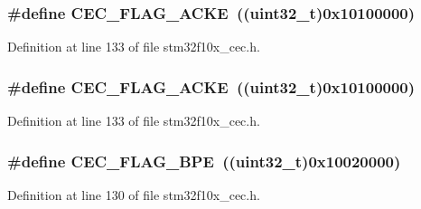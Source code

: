 \subsubsection[{\texorpdfstring{C\+E\+C\+\_\+\+F\+L\+A\+G\+\_\+\+A\+C\+KE}{CEC_FLAG_ACKE}}]{\setlength{\rightskip}{0pt plus 5cm}\#define C\+E\+C\+\_\+\+F\+L\+A\+G\+\_\+\+A\+C\+KE~(({\bf uint32\+\_\+t})0x10100000)}\hypertarget{group___c_e_c__flags__definition_ga1583b7a221e54f2f19cb121bf310547c}{}\label{group___c_e_c__flags__definition_ga1583b7a221e54f2f19cb121bf310547c}


Definition at line 133 of file stm32f10x\+\_\+cec.\+h.

\subsubsection[{\texorpdfstring{C\+E\+C\+\_\+\+F\+L\+A\+G\+\_\+\+A\+C\+KE}{CEC_FLAG_ACKE}}]{\setlength{\rightskip}{0pt plus 5cm}\#define C\+E\+C\+\_\+\+F\+L\+A\+G\+\_\+\+A\+C\+KE~(({\bf uint32\+\_\+t})0x10100000)}\hypertarget{group___c_e_c__flags__definition_ga1583b7a221e54f2f19cb121bf310547c}{}\label{group___c_e_c__flags__definition_ga1583b7a221e54f2f19cb121bf310547c}


Definition at line 133 of file stm32f10x\+\_\+cec.\+h.

\subsubsection[{\texorpdfstring{C\+E\+C\+\_\+\+F\+L\+A\+G\+\_\+\+B\+PE}{CEC_FLAG_BPE}}]{\setlength{\rightskip}{0pt plus 5cm}\#define C\+E\+C\+\_\+\+F\+L\+A\+G\+\_\+\+B\+PE~(({\bf uint32\+\_\+t})0x10020000)}\hypertarget{group___c_e_c__flags__definition_gaf2a5d5dcbc57fc0cf7cfa988533a2a09}{}\label{group___c_e_c__flags__definition_gaf2a5d5dcbc57fc0cf7cfa988533a2a09}


Definition at line 130 of file stm32f10x\+\_\+cec.\+h.

